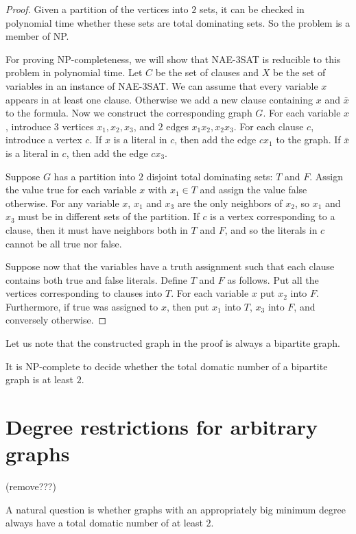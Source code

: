 \begin{proof}
  Given a partition of the vertices into $2$ sets, it can be checked in polynomial
  time whether these sets are total dominating sets. So the problem is a member
  of NP.

  For proving NP-completeness, we will show that NAE-3SAT is reducible to this problem
  in polynomial time. Let $C$ be the set of clauses and $X$ be the set of variables
  in an instance of NAE-3SAT. We can assume that every variable $x$ appears in at least
  one clause. Otherwise we add a new clause containing $x$ and $\bar{x}$ to
  the formula. Now we construct the corresponding graph $G$. For each variable $x$,
  introduce $3$ vertices $x_1, x_2, x_3$, and $2$ edges $x_1x_2, x_2x_3$. For each
  clause $c$, introduce a vertex $c$. If $x$ is a literal in $c$, then add the edge
  $cx_1$ to the graph. If $\bar{x}$ is a literal in $c$, then add the edge $cx_3$.

  Suppose $G$ has a partition into $2$ disjoint total dominating sets: $T$ and $F$.
  Assign the value true for each variable $x$ with $x_1 \in T$ and assign the value
  false otherwise. For any variable $x$, $x_1$ and $x_3$ are the only neighbors
  of $x_2$, so $x_1$ and $x_3$ must be in different sets of the partition. If $c$
  is a vertex corresponding to a clause, then it must have neighbors both in $T$
  and $F$, and so the literals in $c$ cannot be all true nor false.

  Suppose now that the variables have a truth assignment such that each clause
  contains both true and false literals. Define $T$ and $F$ as follows. Put all
  the vertices corresponding to clauses into $T$. For each variable $x$ put $x_2$
  into $F$. Furthermore, if true was assigned to $x$, then put $x_1$ into $T$, $x_3$
  into $F$, and conversely otherwise.
\end{proof}

Let us note that the constructed graph in the proof is always a bipartite
graph.

\begin{cor}
  It is NP-complete to decide whether the total domatic number of
  a bipartite graph is at least $2$.
\end{cor}

\section{Degree restrictions for arbitrary graphs}
(remove???)

A natural question is whether graphs with an appropriately big minimum degree
always have a total domatic number of at least $2$.

